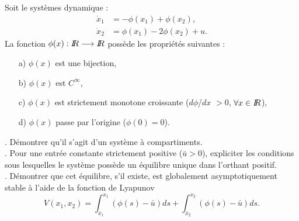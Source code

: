 \begin{exercice}
Soit le systèmes dynamique :
\begin{align*}
\dot x_1 &= - \phi(x_1) + \phi(x_2), \\
\dot x_2 &= \phi(x_1) - 2 \phi(x_2) + u.
\end{align*}
La fonction $\phi(x) : I \! \! R \longrightarrow I \! \! R$ possède les propriétés suivantes :\\
\begin{itemize}
\item[a)] $\phi(x)$ est une bijection,\\
\item[b)] $\phi(x)$ est $C^\infty$,\\
\item[c)] $\phi(x)$ est strictement monotone croissante ($d\phi$/$dx$ $> 0$, $\forall x \in I \! \! R$),\\
\item[d)] $\phi(x)$ passe par l'origine ($\phi(0) = 0$).
\end{itemize}
\vspace{8mm}
. Démontrer qu'il s'agit d'un système à compartiments. \\

. Pour une entrée constante strictement positive ($\bar u > 0$), expliciter les conditions sous lesquelles le système possède un équilibre unique dans l'orthant positif.\\

. Démontrer que cet équilibre, s'il existe, est globalement asymptotiquement stable à l'aide de la fonction de Lyapunov
\begin{equation*}
V(x_1,x_2) = \int_{\bar x_1}^{x_1} (\phi(s) - \bar u) ds + \int_{\bar x_2}^{x_2} (\phi(s) - \bar u) ds.
\end{equation*}

\end{exercice}


